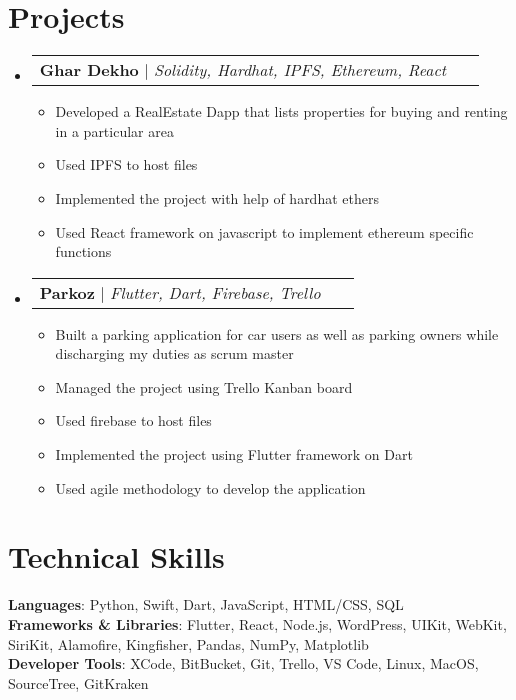 \documentclass[letterpaper,11pt]{article}
\makeatletter
\newcommand{\resumeItem}[1]{
  \item\small{
    {#1 \vspace{-2pt}}
  }
}
\newcommand{\resumeProjectHeading}[2]{
    \item
    \begin{tabular*}{1.001\textwidth}{l@{\extracolsep{\fill}}r}
      \small#1 & \textbf{\small #2}\\
    \end{tabular*}\vspace{-7pt}
}
\newcommand{\resumeSubHeadingListStart}{\begin{itemize}[leftmargin=0.0in, label={}]}
\newcommand{\resumeSubHeadingListEnd}{\end{itemize}}
\newcommand{\resumeItemListStart}{\begin{itemize}}
\newcommand{\resumeItemListEnd}{\end{itemize}\vspace{-5pt}}
\makeatother
\begin{document}
\section{Projects}
    \vspace{-5pt}
    \resumeSubHeadingListStart
      \resumeProjectHeading
          {\textbf{Ghar Dekho} $|$ \emph{Solidity, Hardhat, IPFS, Ethereum, React}}\
          \resumeItemListStart
            \resumeItem{Developed a RealEstate Dapp that lists properties for buying and renting in a particular area}
            \resumeItem{Used IPFS to host files}
            \resumeItem{Implemented the project with help of hardhat ethers}
            \resumeItem{Used React framework on javascript to implement ethereum specific functions}
          \resumeItemListEnd
          \vspace{-20pt}
      \resumeProjectHeading
          {\textbf{Parkoz} $|$ \emph{Flutter, Dart, Firebase, Trello}}\
          \resumeItemListStart
            \resumeItem{Built a parking application for car users as well as parking owners while discharging my duties as scrum master}
            \resumeItem{Managed the project using Trello Kanban board}
            \resumeItem{Used firebase to host files}
            \resumeItem{Implemented the project using Flutter framework on Dart}
            \resumeItem{Used agile methodology to develop the application}
          \resumeItemListEnd
    \resumeSubHeadingListEnd
\vspace{-15pt}


%
\section{Technical Skills}
 \begin{itemize}[leftmargin=0.15in, label={}]
    \small{\item{
     \textbf{Languages}{: Python, Swift, Dart, JavaScript, HTML/CSS, SQL} \\
     \textbf{Frameworks \& Libraries}{: Flutter, React, Node.js,  WordPress, UIKit, WebKit, SiriKit, Alamofire, Kingfisher, Pandas, NumPy, Matplotlib} \\
     \textbf{Developer Tools}{: XCode, BitBucket, Git, Trello, VS Code, Linux, MacOS, SourceTree, GitKraken}
    }}
 \end{itemize}
 \vspace{-16pt}
\end{document}
